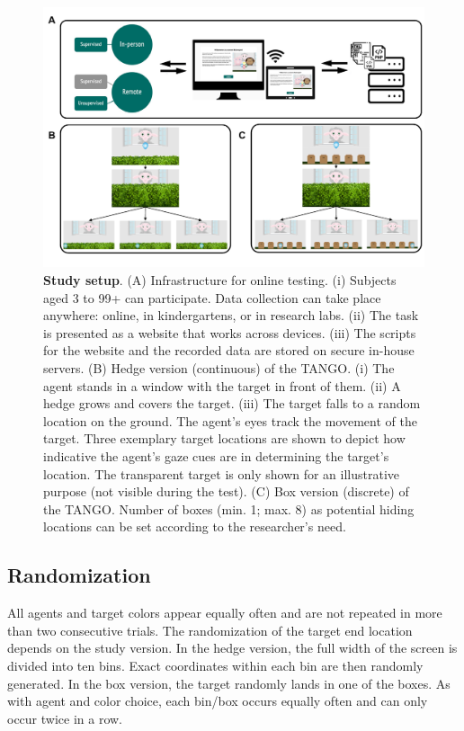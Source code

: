 \documentclass[
  man,floatsintext]{apa7}
\begin{document}
\begin{figure}

{\centering \includegraphics[width=1\linewidth]{../figures/tango_procedure} 

}

\caption{\textbf{Study setup}. (A) Infrastructure for online testing. (i) Subjects aged 3 to 99+ can participate. Data collection can take place anywhere: online, in kindergartens, or in research labs. (ii) The task is presented as a website that works across devices. (iii) The scripts for the website and the recorded data are stored on secure in-house servers. (B) Hedge version (continuous) of the TANGO. (i) The agent stands in a window with the target in front of them. (ii) A hedge grows and covers the target. (iii) The target falls to a random location on the ground. The agent's eyes track the movement of the target. Three exemplary target locations are shown to depict how indicative the agent's gaze cues are in determining the target's location. The transparent target is only shown for an illustrative purpose (not visible during the test). (C) Box version (discrete) of the TANGO. Number of boxes (min. 1; max. 8) as potential hiding locations can be set according to the researcher's need.}\label{fig:fig1}
\end{figure}

\hypertarget{randomization}{%
\subsection{Randomization}\label{randomization}}

All agents and target colors appear equally often and are not repeated in more than two consecutive trials.
The randomization of the target end location depends on the study version.
In the hedge version, the full width of the screen is divided into ten bins.
Exact coordinates within each bin are then randomly generated.
In the box version, the target randomly lands in one of the boxes.
As with agent and color choice, each bin/box occurs equally often and can only occur twice in a row.
\end{document}
